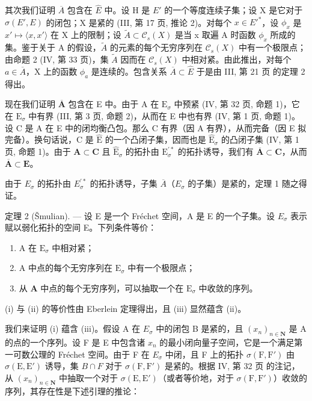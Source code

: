 其次我们证明 \(\overline{A}\) 包含在 \(\hat{E}\) 中。设 H 是 \(E'\) 的一个等度连续子集；设 X 是它对于 \(\sigma(E', E)\) 的闭包；X 是紧的 (III, 第 17 页, 推论 2)。对每个 \(x \in E'^{*}\)，设 \(\phi_{x}\) 是 \(x' \mapsto \langle x, x' \rangle\) 在 X 上的限制；设 \(\tilde{A} \subset \mathcal{C}_{s}(X)\) 是当 x 取遍 A 时函数 \(\phi_{x}\) 所成的集。鉴于关于 A 的假设，\(\tilde{A}\) 的元素的每个无穷序列在 \(\mathcal{C}_{s}(X)\) 中有一个极限点；由命题 2 (IV, 第 33 页)，集 \(\tilde{A}\) 因而在 \(\mathcal{C}_{s}(X)\) 中相对紧。由此推出，对每个 \(a \in \overline{A}\)，X 上的函数 \(\phi_{a}\) 是连续的。包含关系 \(\overline{A} \subset \hat{E}\) 于是由 III, 第 21 页 的定理 2 得出。

现在我们证明 \(\overline{\mathbf{A}}\) 包含在 E 中。由于 A 在 \(\mathrm{E}_{\sigma}\) 中预紧 (IV, 第 32 页, 命题 1)，它在 \(\mathrm{E}_{\sigma}\) 中有界 (III, 第 3 页, 命题 2)，从而在 E 中也有界 (IV, 第 1 页, 命题 1)。设 C 是 A 在 E 中的闭均衡凸包。那么 C 有界（因 A 有界），从而完备（因 E 拟完备）。换句话说，C 是 \(\hat{\mathrm{E}}\) 的一个凸闭子集，因而也是 \(\hat{\mathrm{E}}_{\sigma}\) 的凸闭子集 (IV, 第 1 页, 命题 1)。由于 \(\mathbf{A} \subset \mathbf{C}\) 且 \(\hat{\mathrm{E}}_{\sigma}\) 的拓扑由 \(\mathrm{E}_{\sigma}^{\prime *}\) 的拓扑诱导，我们有 \(\overline{\mathbf{A}} \subset \mathbf{C}\)，从而 \(\overline{\mathbf{A}} \subset \mathbf{E}\)。

由于 \(E_{\sigma}\) 的拓扑由 \(E_{\sigma}^{\prime*}\) 的拓扑诱导，子集 \(\overline{A}\)（\(E_{\sigma}\) 的子集）是紧的，定理 1 随之得证。

定理 2 (Šmulian). --- 设 E 是一个 Fréchet 空间，A 是 E 的一个子集。设 \(E_{\sigma}\) 表示赋以弱化拓扑的空间 E。下列条件等价：

\begin{enumerate}
\def\labelenumi{(\roman{enumi})}
\item
  A 在 \(\mathrm{E}_{\sigma}\) 中相对紧；
\item
  A 中点的每个无穷序列在 \(\mathrm{E}_{\sigma}\) 中有一个极限点；
\item
  从 \(\mathbf{A}\) 中点的每个无穷序列，可以抽取一个在 \(\mathrm{E}_{\sigma}\) 中收敛的序列。
\end{enumerate}

(i) 与 (ii) 的等价性由 Eberlein 定理得出，且 (iii) 显然蕴含 (ii)。

我们来证明 (i) 蕴含 (iii)。假设 A 在 \(E_{\sigma}\) 中的闭包 B 是紧的，且 \((x_{n})_{n\in\mathbf{N}}\) 是 A 的点的一个序列。设 F 是 E 中包含诸 \(x_{n}\) 的最小闭向量子空间，它是一个满足第一可数公理的 Fréchet 空间。由于 F 在 \(E_{\sigma}\) 中闭，且 F 上的拓扑 \(\sigma(\mathrm{F},\mathrm{F}')\) 由 \(\sigma(\mathrm{E},\mathrm{E}')\) 诱导，集 \(B\cap F\) 对于 \(\sigma(\mathrm{F},\mathrm{F}')\) 是紧的。根据 IV, 第 32 页 的注记，从 \((x_{n})_{n\in\mathbf{N}}\) 中抽取一个对于 \(\sigma(\mathrm{E},\mathrm{E}')\)（或者等价地，对于 \(\sigma(\mathrm{F},\mathrm{F}')\)）收敛的序列，其存在性是下述引理的推论：


